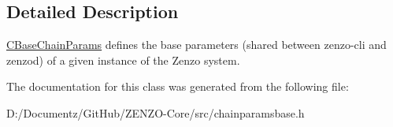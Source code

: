 \subsection{Detailed Description}
\mbox{\hyperlink{class_c_base_chain_params}{C\+Base\+Chain\+Params}} defines the base parameters (shared between zenzo-\/cli and zenzod) of a given instance of the Zenzo system. 

The documentation for this class was generated from the following file\+:\begin{DoxyCompactItemize}
\item 
D\+:/\+Documentz/\+Git\+Hub/\+Z\+E\+N\+Z\+O-\/\+Core/src/chainparamsbase.\+h\end{DoxyCompactItemize}
